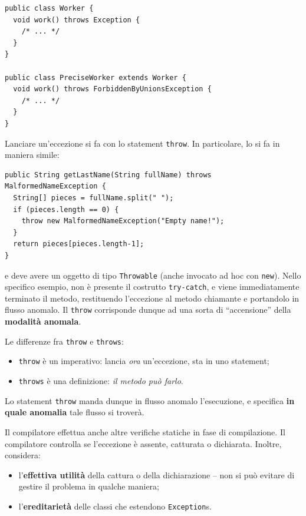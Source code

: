 \documentclass[\fontsizeclass,twocolumn]{\classname}
\theoremstyle{definition}
\theoremstyle{definition}
\begin{document}
\begin{lstlisting}
public class Worker {
  void work() throws Exception {
    /* ... */
  }
}

public class PreciseWorker extends Worker {
  void work() throws ForbiddenByUnionsException {
    /* ... */
  }
}
\end{lstlisting}

Lanciare un'eccezione si fa con lo statement \texttt{throw}. In particolare, lo
si fa in maniera simile:

\begin{lstlisting}
public String getLastName(String fullName) throws MalformedNameException {
  String[] pieces = fullName.split(" ");
  if (pieces.length == 0) {
    throw new MalformedNameException("Empty name!");
  }
  return pieces[pieces.length-1];
}
\end{lstlisting}

e deve avere un oggetto di tipo \texttt{Throwable} (anche invocato ad hoc con
\texttt{new}). Nello specifico esempio, non è presente il costrutto
\texttt{try\--catch}, e viene immediatamente terminato il metodo, restituendo
l'eccezione al metodo chiamante e portandolo in flusso anomalo. Il
\texttt{throw} corrisponde dunque ad una sorta di ``accensione'' della
\textbf{modalità anomala}.

Le differenze fra \texttt{throw} e \texttt{throws}:
\begin{itemize}
    \item \texttt{throw} è un imperativo: lancia \emph{ora} un'eccezione, sta
        in uno statement;
    \item \texttt{throws} è una definizione: \emph{il metodo può farlo}.
\end{itemize}

Lo statement \texttt{throw} manda dunque in flusso anomalo l'esecuzione, e
specifica \textbf{in quale anomalia} tale flusso si troverà.

Il compilatore effettua anche altre verifiche statiche in fase di compilazione.
Il compilatore controlla se l'eccezione è assente, catturata o dichiarata.
Inoltre, considera:
\begin{itemize}
    \item l'\textbf{effettiva utilità} della cattura o della dichiarazione --
        non si può evitare di gestire il problema in qualche maniera;
    \item l'\textbf{ereditarietà} delle classi che estendono
        \texttt{Exception}s.
\end{itemize}
\end{document}
